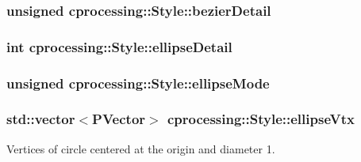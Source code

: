 \hypertarget{classcprocessing_1_1Style_af066cb110b19a792122f230f11c7cf57}{
\subsubsection[{bezier\-Detail}]{\setlength{\rightskip}{0pt plus 5cm}unsigned {\bf cprocessing\-::\-Style\-::bezier\-Detail}}}\label{classcprocessing_1_1Style_af066cb110b19a792122f230f11c7cf57}
\hypertarget{classcprocessing_1_1Style_ab57be3369f09dda4193bd28665776155}{
\subsubsection[{ellipse\-Detail}]{\setlength{\rightskip}{0pt plus 5cm}int {\bf cprocessing\-::\-Style\-::ellipse\-Detail}}}\label{classcprocessing_1_1Style_ab57be3369f09dda4193bd28665776155}
\hypertarget{classcprocessing_1_1Style_ac45b66048241d2ecd1cc45f3d33ee1a9}{
\subsubsection[{ellipse\-Mode}]{\setlength{\rightskip}{0pt plus 5cm}unsigned {\bf cprocessing\-::\-Style\-::ellipse\-Mode}}}\label{classcprocessing_1_1Style_ac45b66048241d2ecd1cc45f3d33ee1a9}
\hypertarget{classcprocessing_1_1Style_a42743879ae50e0d629ecb1f3adfd5326}{
\subsubsection[{ellipse\-Vtx}]{\setlength{\rightskip}{0pt plus 5cm}std\-::vector$<${\bf \-P\-Vector}$>$ {\bf cprocessing\-::\-Style\-::ellipse\-Vtx}}}\label{classcprocessing_1_1Style_a42743879ae50e0d629ecb1f3adfd5326}


\-Vertices of circle centered at the origin and diameter 1. 

